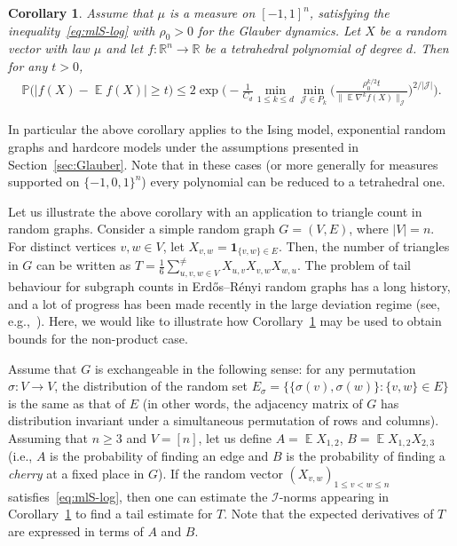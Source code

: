 \documentclass[a4paper]{amsart}
\newtheorem{corollary}[theorem]{Corollary} %
\theoremstyle{definition}
\theoremstyle{remark}
\numberwithin{equation}{section}
\newcommand*{\RR}{\mathbb{R}}
\DeclareMathOperator{\EE}{\mathbb{E}} %
\newcommand*{\PP}{\mathbb{P}} %
\newcommand*{\ind}[1]{\mathbf{1}_{#1}}
\begin{document}
\begin{corollary}\label{cor:polynomials} Assume that $\mu$ is a measure on $[-1,1]^n$, satisfying the inequality~\eqref{eq:mlS-log} with $\rho_0 > 0$ for the Glauber dynamics. Let $X$ be a random vector with law $\mu$ and let $f \colon \RR^n \to \RR$ be a tetrahedral polynomial of degree $d$. Then for any $t > 0$,
\begin{align}\label{eq:polynomials}
\PP\Big(\Big|f(X) - \EE f(X)\Big| \ge t\Big)\le 2\exp\Big(-\frac{1}{C_d}\min_{1\le k \le d} \min_{\mathcal{J}\in P_k}\Big(\frac{\rho_0^{k/2} t}{\|\EE \nabla^k f(X)\|_{\mathcal{J}}}\Big)^{2/|\mathcal{J}|}\Big).
\end{align}
\end{corollary}

In particular the above corollary applies to the Ising model, exponential random graphs and hardcore models under the assumptions presented in Section~\ref{sec:Glauber}. Note that in these cases (or more generally for measures supported on $\{-1,0,1\}^n$) every polynomial can be reduced to a tetrahedral one.

Let us illustrate the above corollary with an application to triangle count in random graphs. Consider a simple random graph $G = (V,E)$, where $|V| = n$. For distinct vertices $v,w \in V$, let $X_{v,w} = \ind{\{v,w\}\in E}$. Then, the number of triangles in $G$ can be written as $T = \frac{1}{6}\sum_{u,v,w \in V}^{\neq} X_{u,v}X_{v,w}X_{w,u}$. The problem of tail behaviour for subgraph counts in Erd\H{o}s--R\'enyi random graphs has a long history, and a lot of progress has been made recently in the large deviation regime (see, e.g.,~\cite{MR3519474,MR3632418}). Here, we would like to illustrate how Corollary~\ref{cor:polynomials} may be used to obtain bounds for the non-product case. 

Assume that $G$ is exchangeable in the following sense: for any permutation $\sigma\colon V\to V$, the distribution of the random set $E_\sigma = \{\{\sigma(v),\sigma(w)\} \colon \{v,w\}\in E\}$ is the same as that of $E$ (in other words, the adjacency matrix of $G$ has distribution invariant under a simultaneous permutation of rows and columns).  Assuming that $n\ge 3$ and $V = [n]$, let us define $A = \EE X_{1,2}$, $B = \EE X_{1,2}X_{2,3}$ (i.e., $A$ is the probability of finding an edge and $B$ is the probability of finding a \emph{cherry} at a fixed place in $G$). If the random vector $(X_{v,w})_{1\le v<  w \le n}$ satisfies~\eqref{eq:mlS-log}, then one can estimate the $\mathcal{I}$-norms appearing in Corollary~\ref{cor:polynomials} to find a tail estimate for $T$. Note that the expected derivatives of $T$ are expressed in terms of $A$ and $B$. 
\end{document}
